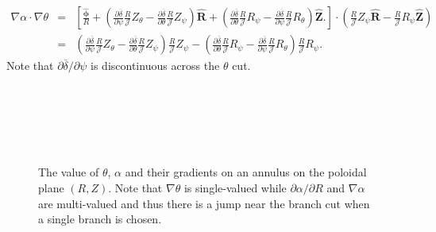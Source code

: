 \documentclass{article}
\newcommand{\tmmathbf}[1]{\ensuremath{\boldsymbol{#1}}}
\begin{document}
\begin{eqnarray}
  \nabla \alpha \cdot \nabla \theta & = & \left[
  \frac{\hat{\tmmathbf{\phi}}}{R} + \left( \frac{\partial
  \overline{\delta}}{\partial \psi} \frac{R}{\mathcal{J}} Z_{\theta} -
  \frac{\partial \overline{\delta}}{\partial \theta} \frac{R}{\mathcal{J}}
  Z_{\psi} \right) \hat{\mathbf{R}} + \left( \frac{\partial
  \overline{\delta}}{\partial \theta} \frac{R}{\mathcal{J}} R_{\psi} -
  \frac{\partial \overline{\delta}}{\partial \psi} \frac{R}{\mathcal{J}}
  R_{\theta} \right) \hat{\mathbf{Z}} . \right] \cdot \left(
  \frac{R}{\mathcal{J}} Z_{\psi} \hat{\mathbf{R}} - \frac{R}{\mathcal{J}}
  R_{\psi} \hat{\mathbf{Z}} \right) \nonumber\\
  & = & \left( \frac{\partial \overline{\delta}}{\partial \psi}
  \frac{R}{\mathcal{J}} Z_{\theta} - \frac{\partial
  \overline{\delta}}{\partial \theta} \frac{R}{\mathcal{J}} Z_{\psi} \right)
  \frac{R}{\mathcal{J}} Z_{\psi} - \left( \frac{\partial
  \overline{\delta}}{\partial \theta} \frac{R}{\mathcal{J}} R_{\psi} -
  \frac{\partial \overline{\delta}}{\partial \psi} \frac{R}{\mathcal{J}}
  R_{\theta} \right) \frac{R}{\mathcal{J}} R_{\psi} . 
\end{eqnarray}
Note that $\partial \overline{\delta} / \partial \psi$ is discontinuous across
the $\theta$ cut.

\

\

\begin{figure}[h]
  
  
  \
  
  \caption{\label{17-11-10-p1}The value of $\theta$, $\alpha$ and their
  gradients on an annulus on the poloidal plane $(R, Z)$. Note that $\nabla
  \theta$ is single-valued while $\partial \alpha / \partial R$ and $\nabla
  \alpha$ are multi-valued and thus there is a jump near the branch cut when a
  single branch is chosen.}
\end{figure}
\end{document}
